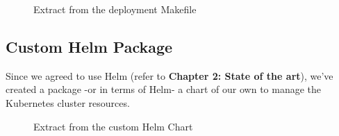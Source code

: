 \begin{figure}[H]
    \centering
    \caption{Extract from the deployment Makefile}
    \label{fig:extract-from-cd-makefile}
\end{figure}

\subsection{Custom Helm Package}
Since we agreed to use Helm (refer to \textbf{Chapter 2: State of the art}), we've created a package -or in terms of Helm- a chart of our own to manage the Kubernetes cluster resources.

\begin{figure}[H]
    \centering
    \caption{Extract from the custom Helm Chart}
    \label{fig:extract-from-custom-helm-chart}
\end{figure}

